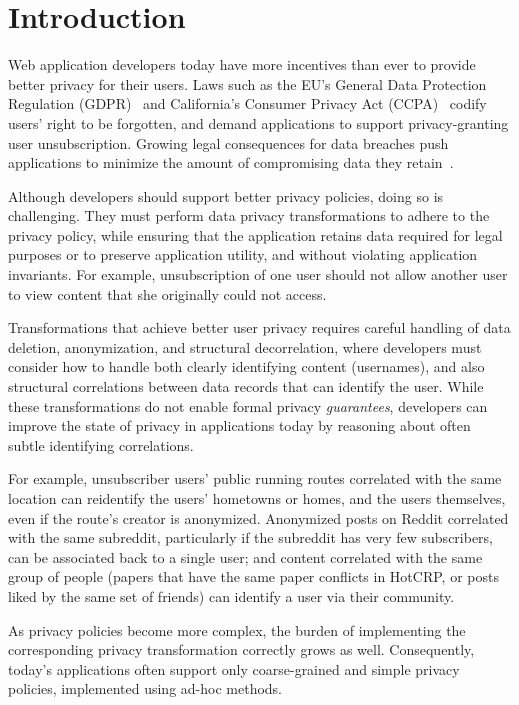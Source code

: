 \section{Introduction}
Web application developers today have more incentives than ever to provide better privacy for their
users.
%
Laws such as the EU's General Data Protection Regulation (GDPR)~\cite{eu:gdpr} and California's
Consumer Privacy Act (CCPA)~\cite{ca:privacy-act} codify users' right to be forgotten, and demand
applications to support privacy-granting user unsubscription.
%
Growing legal consequences for data breaches push applications to minimize the amount of
compromising data they retain~\cite{breach:amazon,breach:twitter, breach:fb, breach:marriott,
breach:quora}.

Although developers should support better privacy policies, doing so is challenging.  They must
perform data privacy transformations to adhere to the privacy policy, while ensuring that the
application retains data required for legal purposes or to preserve application utility, and without
violating application invariants.
%
For example, unsubscription of one user should not allow another user to view content that she
originally could not access.

Transformations that achieve better user privacy requires careful handling of data deletion,
anonymization, and structural decorrelation, where developers must consider how to handle both
clearly identifying content (\eg usernames), and also structural correlations between data records
that can identify the user.
While these transformations do not enable formal privacy \emph{guarantees}, developers can improve the state of privacy in applications today by reasoning about often subtle identifying correlations.

For example, unsubscriber users' public running routes correlated with the same location can
reidentify the users' hometowns or homes, and the users themselves, even if the route's creator is
anonymized. Anonymized posts on Reddit correlated with the same subreddit, particularly if the
subreddit has very few subscribers, can be associated back to a single user; and
content correlated with the same group of people (\eg papers that have the same paper conflicts in
HotCRP, or posts liked by the same set of friends) can identify a user via their community.

As privacy policies become more complex, the burden of implementing the corresponding privacy
transformation correctly grows as well.
Consequently, today's applications often support only coarse-grained and simple privacy policies,
implemented using ad-hoc methods.

